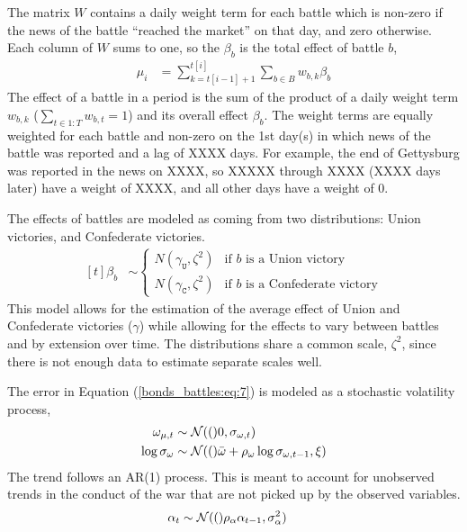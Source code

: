 The matrix $W$ contains a daily weight term for each battle which is non-zero if the news of the battle ``reached the market'' on that day, and zero otherwise.
Each column of $W$ sums to one, so the $\beta_{b}$ is the total effect of battle $b$,
\begin{align}
  \label{bonds_battles:eq:1}
  \mu_{i} &= \sum_{k = t[i-1] + 1}^{t[i]} \sum_{b \in B} w_{b,k} \beta_{b}
\end{align}
The effect of a battle in a period is the sum of the product of a daily weight term $w_{b,k}$ ($\sum_{t \in 1:T} w_{b,t} = 1$) and its overall effect $\beta_{b}$.
The weight terms are equally weighted for each battle and non-zero on the 1st day(s) in which news of the battle was reported and a lag of XXXX days.
For example, the end of Gettysburg was reported in the news on XXXX, so XXXXX through XXXX (XXXX days later) have a weight of XXXX, and all other days have a weight of 0.

The effects of battles are modeled as coming from two distributions: Union victories, and Confederate victories.
\begin{equation}
  \label{bonds_battles:eq:4}
  \begin{aligned}[t]
  \beta_{b} &\sim
  \begin{cases}
    N(\gamma_{\mathtt{U}}, \zeta^{2}) & \text{if $b$ is a Union victory} \\
    N(\gamma_{\mathtt{C}}, \zeta^{2}) & \text{if $b$ is a Confederate victory}
  \end{cases}
  \end{aligned}
\end{equation}
This model allows for the estimation of the average effect of Union and Confederate victories ($\gamma$) while allowing for the effects to vary between battles and by extension over time.
The distributions share a common scale, $\zeta^{2}$, since there is not enough data to estimate separate scales well.

The error in Equation (\ref{bonds_battles:eq:7}) is modeled as a stochastic volatility process,
\begin{equation*}
  \label{bonds_battles:eq:9}
  \begin{aligned}[t]
    \omega_{\mu,t} & \sim \mathcal{N}\mathopen{}\left((\right)\mathclose{}0, \sigma_{\omega, t}) \\
    \log \sigma_{\omega} &\sim \mathcal{N}\mathopen{}\left((\right)\mathclose{}\bar{\omega} + \rho_{\omega} \log \sigma_{\omega, t - 1}, \xi)
  \end{aligned}
\end{equation*}
The trend follows an AR(1) process.
This is meant to account for unobserved trends in the conduct of the war that are not picked up by the observed variables.
\begin{align}
  \label{bonds_battles:eq:8}
  \alpha_{t} &\sim \mathcal{N}\mathopen{}\left((\right)\mathclose{}\rho_{\alpha} \alpha_{t - 1}, \sigma_{\alpha}^{2})
\end{align}

